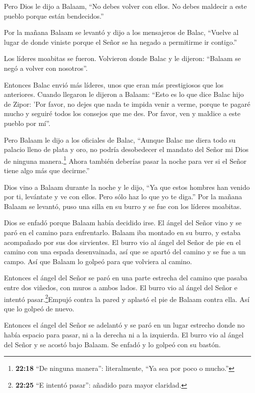  Pero Dios le dijo a Balaam, ``No debes volver con ellos.
No debes maldecir a este pueblo porque están bendecidos.''

 Por la mañana Balaam se levantó y dijo a los mensajeros de
Balac, ``Vuelve al lugar de donde viniste porque el Señor se ha negado a
permitirme ir contigo.''

 Los líderes moabitas se fueron. Volvieron donde Balac y le
dijeron: ``Balaam se negó a volver con nosotros''.

 Entonces Balac envió más líderes, unos que eran más
prestigiosos que los anteriores.  Cuando llegaron le
dijeron a Balaam: ``Esto es lo que dice Balac hijo de Zipor: 'Por favor,
no dejes que nada te impida venir a verme,  porque te
pagaré mucho y seguiré todos los consejos que me des. Por favor, ven y
maldice a este pueblo por mí''.

 Pero Balaam le dijo a los oficiales de Balac, ``Aunque
Balac me diera todo su palacio lleno de plata y oro, no podría
desobedecer el mandato del Señor mi Dios de ninguna manera.\footnote{\textbf{22:18}
  ``De ninguna manera'': literalmente, ``Ya sea por poco o mucho.''}
 Ahora también deberías pasar la noche para ver si el Señor
tiene algo más que decirme.''

 Dios vino a Balaam durante la noche y le dijo, ``Ya que
estos hombres han venido por ti, levántate y ve con ellos. Pero sólo haz
lo que yo te diga.''  Por la mañana Balaam se levantó, puso
una silla en su burro y se fue con los líderes moabitas.

 Dios se enfadó porque Balaam había decidido irse. El ángel
del Señor vino y se paró en el camino para enfrentarlo. Balaam iba
montado en su burro, y estaba acompañado por sus dos sirvientes.
 El burro vio al ángel del Señor de pie en el camino con
una espada desenvainada, así que se apartó del camino y se fue a un
campo. Así que Balaam lo golpeó para que volviera al camino.

 Entonces el ángel del Señor se paró en una parte estrecha
del camino que pasaba entre dos viñedos, con muros a ambos lados.
 El burro vio al ángel del Señor e intentó
pasar.\footnote{\textbf{22:25} ``E intentó pasar'': añadido para mayor
  claridad.}Empujó contra la pared y aplastó el pie de Balaam contra
ella. Así que lo golpeó de nuevo.

 Entonces el ángel del Señor se adelantó y se paró en un
lugar estrecho donde no había espacio para pasar, ni a la derecha ni a
la izquierda.  El burro vio al ángel del Señor y se acostó
bajo Balaam. Se enfadó y lo golpeó con su bastón.

